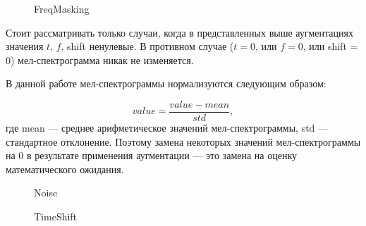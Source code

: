 \documentclass[12pt, fleqn]{article}
\begin{document}
\begin{figure}[ht!]
		\caption{FreqMasking}
		\label{fig:i6}
\end{figure}

Стоит рассматривать только случаи, когда в представленных выше аугментациях значения $t$, $f$, shift ненулевые. В противном случае ($t = 0$, или $f = 0$, или shift = 0) мел-спектрограмма никак не изменяется.

В данной работе мел-спектрограммы нормализуются следующим образом: 

$$value = \frac{value - mean}{std},$$ где mean --- среднее арифметическое значений мел-спектрограммы, std --- стандартное отклонение. Поэтому замена некоторых значений мел-спектрограммы на 0 в результате применения аугментации --- это замена на оценку математического ожидания.
\newpage
\begin{figure}[ht!]
		\caption{Noise}
		\label{fig:i7}
\end{figure}

\begin{figure}[ht!]
		\caption{TimeShift}
		\label{fig:i8}
\end{figure}
\end{document}
